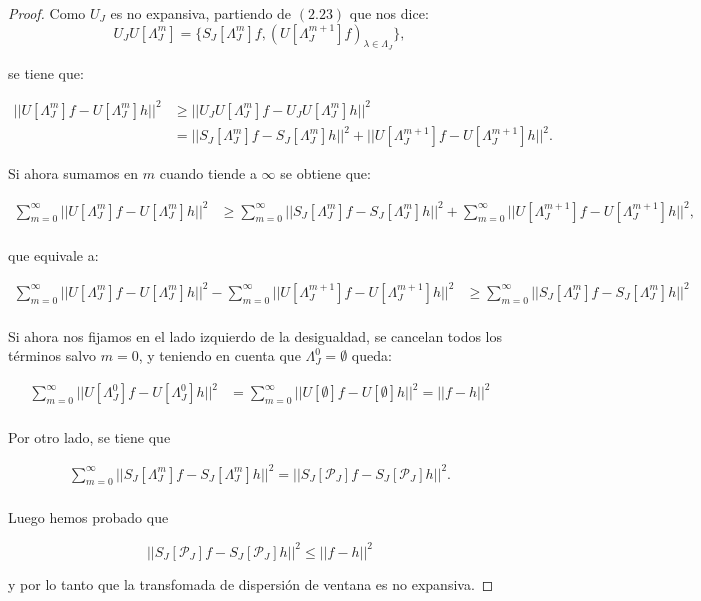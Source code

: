 \begin{proof}
Como $U_J$ es no expansiva, partiendo de $(2.23)$ que nos dice: 
$$U_J U[\Lambda_J^m]=\lbrace S_J[\Lambda_J^m]f,(U[\Lambda_J^{m+1}]f)_{\lambda\in\Lambda_J}\rbrace,$$

se tiene que:

\begin{align*}
    ||U[\Lambda_J^m]f-U[\Lambda_J^m]h||^2 &\geq ||U_J U[\Lambda_J^m]f-U_J U[\Lambda_J^m]h||^2 \\
    & = ||S_J[\Lambda_J^m]f - S_J[\Lambda_J^m]h||^2 + ||U[\Lambda_J^{m+1}]f-U[\Lambda_J^{m+1}]h||^2.
\end{align*}

\medskip

\noindent Si ahora sumamos en $m$ cuando tiende a $\infty$ se obtiene que: 

\begin{align*}
  \sum_{m=0}^{\infty}||U[\Lambda_J^m]f-U[\Lambda_J^m]h||^2 &\geq \sum_{m=0}^{\infty} ||S_J[\Lambda_J^m]f - S_J[\Lambda_J^m]h||^2 + \sum_{m=0}^{\infty} ||U[\Lambda_J^{m+1}]f-U[\Lambda_J^{m+1}]h||^2,\\
\end{align*}

\noindent que equivale a:

\begin{align*}
  \sum_{m=0}^{\infty}||U[\Lambda_J^m]f-U[\Lambda_J^m]h||^2 - \sum_{m=0}^{\infty} ||U[\Lambda_J^{m+1}]f-U[\Lambda_J^{m+1}]h||^2 &\geq \sum_{m=0}^{\infty} ||S_J[\Lambda_J^m]f - S_J[\Lambda_J^m]h||^2\\
\end{align*}

\noindent Si ahora nos fijamos en el lado izquierdo de la desigualdad, se cancelan todos los términos salvo $m=0$, y teniendo en cuenta que $\Lambda^0_J=\emptyset$ queda: 

\begin{align*}
  \sum_{m=0}^{\infty}||U[\Lambda_J^0]f-U[\Lambda_J^0]h||^2 &= \sum_{m=0}^{\infty}||U[\emptyset]f-U[\emptyset]h||^2 = || f - h ||^2 \\
\end{align*}

\noindent Por otro lado, se tiene que

\begin{align*}
  \sum_{m=0}^{\infty} ||S_J[\Lambda_J^m]f - S_J[\Lambda_J^m]h||^2 = ||S_J[\mathcal{P}_J]f - S_J[\mathcal{P}_J]h||^2. \\
\end{align*}

\noindent Luego hemos probado que 

$$||S_J[\mathcal{P}_J]f - S_J[\mathcal{P}_J]h||^2 \leq || f - h ||^2$$

\noindent y por lo tanto que la transfomada de dispersión de ventana es no expansiva. \qedhere
\end{proof}

